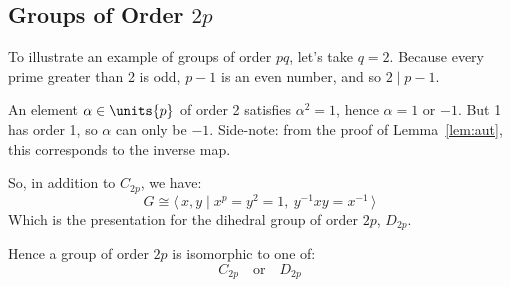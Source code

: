 \subsection{Groups of Order \(2p\)}
To illustrate an example of groups of order \(pq\), let's take \(q = 2\).
Because every prime greater than 2 is odd, \(p - 1\) is an even number, and so \(2 \mid p - 1\).

An element \(\alpha \in \units{p}\) of order 2 satisfies \(\alpha^2 = 1\), hence \(\alpha = 1\) or \(-1\).
But 1 has order 1, so \(\alpha\) can only be \(-1\).
Side-note: from the proof of Lemma~\ref{lem:aut}, this corresponds to the inverse map.

So, in addition to \(C_{2p}\), we have:
\[G \cong \langle\, x, y \mid x^p = y^2 = 1,\ y^{-1}xy = x^{-1}\,\rangle\]
Which is the presentation for the dihedral group of order \(2p\), \(D_{2p}\).

Hence a group of order \(2p\) is isomorphic to one of:
\[C_{2p} \quad \text{or} \quad D_{2p}\]
